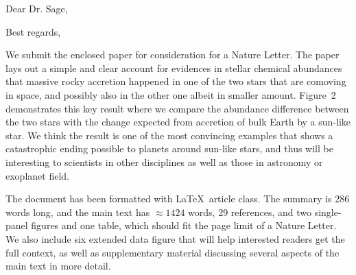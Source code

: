 \documentclass[12pt,letter,roman]{moderncv}
\begin{document}
\date{\today}
\opening{Dear Dr. Sage,}
\closing{Best regards,}
\makelettertitle

We submit the enclosed paper for consideration for a Nature Letter.
The paper lays out a simple and clear account for evidences in stellar
chemical abundances that massive rocky accretion happened in one of the two
stars that are comoving in space, and possibly also in the other one albeit in
smaller amount. Figure~2 demonstrates this key result where we compare
the abundance difference between the two stars with the change
expected from accretion of bulk Earth by a sun-like star.
We think the result is one of the most convincing examples that shows a
catastrophic ending possible to planets around sun-like stars, and thus will be
interesting to scientists in other disciplines as well as those in astronomy or
exoplanet field.

The document has been formatted with \LaTeX\ article class.
The summary is 286 words long, and the main text has $\approx 1424$ words,
29 references,
and two single-panel figures and one table, which should fit the page limit
of a Nature Letter.
We also include six extended data figure that will help interested readers
get the full context, as well as supplementary material discussing several
aspects of the main text in more detail.

\vspace{0.5cm}


\makeletterclosing
\end{document}
